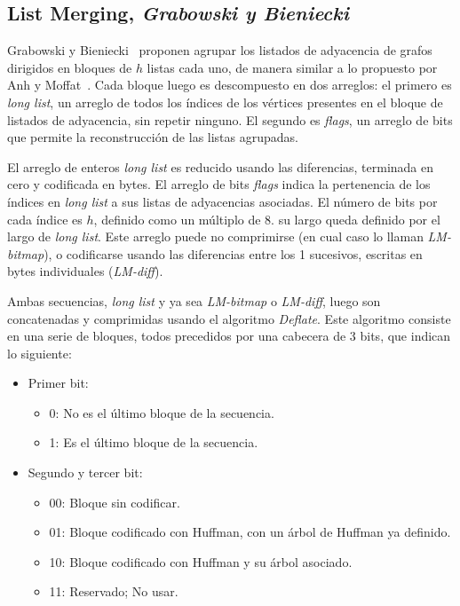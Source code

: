 \subsection{List Merging, \textit{Grabowski y Bieniecki}}
Grabowski y Bieniecki~\cite{grabowski2014tight} proponen agrupar los listados de adyacencia de grafos dirigidos en bloques de $h$ listas cada uno, de manera similar a lo propuesto por Anh y Moffat~\cite{anh2010local}. Cada bloque luego es descompuesto en dos arreglos: el primero es \textit{long list}, un arreglo de todos los índices de los vértices presentes en el bloque de listados de adyacencia, sin repetir ninguno. El segundo es \textit{flags}, un arreglo de bits que permite la reconstrucción de las listas agrupadas. 

El arreglo de enteros \textit{long list} es reducido usando las diferencias, terminada en cero y codificada en bytes. El arreglo de bits \textit{flags} indica la pertenencia de los índices en \textit{long list} a sus listas de adyacencias asociadas. El número de bits por cada índice es $h$, definido como un múltiplo de 8. su largo queda definido por el largo de \textit{long list}. Este arreglo puede no comprimirse (en cual caso lo llaman \textit{LM-bitmap}), o codificarse usando las diferencias entre los 1 sucesivos, escritas en bytes individuales (\textit{LM-diff}).

Ambas secuencias, \textit{long list} y ya sea \textit{LM-bitmap} o \textit{LM-diff}, luego son concatenadas y comprimidas usando el algoritmo \textit{Deflate}. Este algoritmo consiste en una serie de bloques, todos precedidos por una cabecera de 3 bits, que indican lo siguiente:

\begin{itemize}
	\item Primer bit:
	\begin{itemize}
		\item 0: No es el último bloque de la secuencia.
		\item 1: Es el último bloque de la secuencia.
	\end{itemize}
	\item Segundo y tercer bit:
	\begin{itemize}
		\item 00: Bloque sin codificar.
		\item 01: Bloque codificado con Huffman, con un árbol de Huffman ya definido.
		\item 10: Bloque codificado con Huffman y su árbol asociado.
		\item 11: Reservado; No usar.
	\end{itemize}
\end{itemize}

